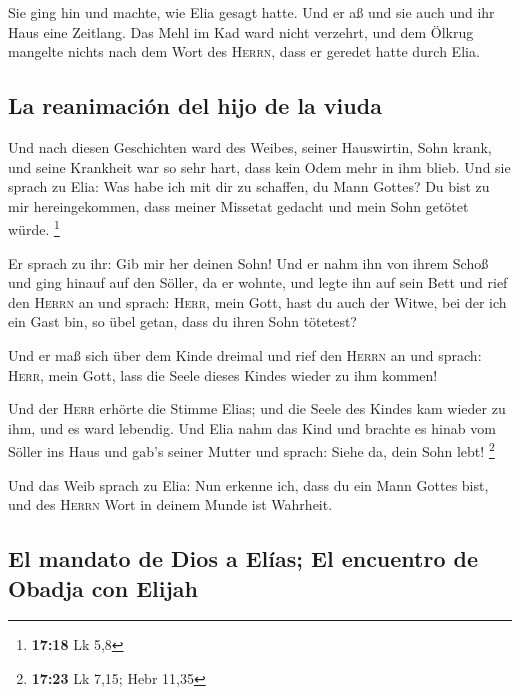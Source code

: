  Sie ging hin und machte, wie Elia gesagt hatte. Und er
aß und sie auch und ihr Haus eine Zeitlang.  Das Mehl im
Kad ward nicht verzehrt, und dem Ölkrug mangelte nichts nach dem Wort
des \textsc{Herrn}, dass er geredet hatte durch Elia.

\hypertarget{la-reanimaciuxf3n-del-hijo-de-la-viuda}{%
\subsection{La reanimación del hijo de la
viuda}\label{la-reanimaciuxf3n-del-hijo-de-la-viuda}}

 Und nach diesen Geschichten ward des Weibes, seiner
Hauswirtin, Sohn krank, und seine Krankheit war so sehr hart, dass kein
Odem mehr in ihm blieb.  Und sie sprach zu Elia: Was habe
ich mit dir zu schaffen, du Mann Gottes? Du bist zu mir hereingekommen,
dass meiner Missetat gedacht und mein Sohn getötet würde. \footnote{\textbf{17:18}
  Lk 5,8}

 Er sprach zu ihr: Gib mir her deinen Sohn! Und er nahm
ihn von ihrem Schoß und ging hinauf auf den Söller, da er wohnte, und
legte ihn auf sein Bett  und rief den \textsc{Herrn} an
und sprach: \textsc{Herr}, mein Gott, hast du auch der Witwe, bei der
ich ein Gast bin, so übel getan, dass du ihren Sohn tötetest?

 Und er maß sich über dem Kinde dreimal und rief den
\textsc{Herrn} an und sprach: \textsc{Herr}, mein Gott, lass die Seele
dieses Kindes wieder zu ihm kommen!

 Und der \textsc{Herr} erhörte die Stimme Elias; und die
Seele des Kindes kam wieder zu ihm, und es ward lebendig.
 Und Elia nahm das Kind und brachte es hinab vom Söller
ins Haus und gab's seiner Mutter und sprach: Siehe da, dein Sohn lebt!
\footnote{\textbf{17:23} Lk 7,15; Hebr 11,35}

 Und das Weib sprach zu Elia: Nun erkenne ich, dass du
ein Mann Gottes bist, und des \textsc{Herrn} Wort in deinem Munde ist
Wahrheit.

\hypertarget{el-mandato-de-dios-a-eluxedas-el-encuentro-de-obadja-con-elijah}{%
\subsection{El mandato de Dios a Elías; El encuentro de Obadja con
Elijah}\label{el-mandato-de-dios-a-eluxedas-el-encuentro-de-obadja-con-elijah}}


